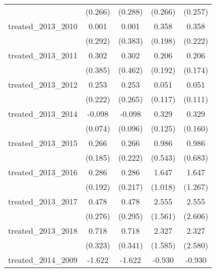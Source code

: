 {\begin{tabular}{l*{4}{c}}
            &     (0.266)         &     (0.288)         &     (0.266)         &     (0.257)         \\
[1em]
treated\_2013\_2010&       0.001         &       0.001         &       0.358         &       0.358         \\
            &     (0.292)         &     (0.383)         &     (0.198)         &     (0.222)         \\
[1em]
treated\_2013\_2011&       0.302         &       0.302         &       0.206         &       0.206         \\
            &     (0.385)         &     (0.462)         &     (0.192)         &     (0.174)         \\
[1em]
treated\_2013\_2012&       0.253         &       0.253         &       0.051         &       0.051         \\
            &     (0.222)         &     (0.265)         &     (0.117)         &     (0.111)         \\
[1em]
treated\_2013\_2014&      -0.098         &      -0.098         &       0.329\sym{**} &       0.329\sym{*}  \\
            &     (0.074)         &     (0.096)         &     (0.125)         &     (0.160)         \\
[1em]
treated\_2013\_2015&       0.266         &       0.266         &       0.986         &       0.986         \\
            &     (0.185)         &     (0.222)         &     (0.543)         &     (0.683)         \\
[1em]
treated\_2013\_2016&       0.286         &       0.286         &       1.647         &       1.647         \\
            &     (0.192)         &     (0.217)         &     (1.018)         &     (1.267)         \\
[1em]
treated\_2013\_2017&       0.478         &       0.478         &       2.555         &       2.555         \\
            &     (0.276)         &     (0.295)         &     (1.561)         &     (2.606)         \\
[1em]
treated\_2013\_2018&       0.718\sym{*}  &       0.718\sym{*}  &       2.327         &       2.327         \\
            &     (0.323)         &     (0.341)         &     (1.585)         &     (2.580)         \\
[1em]
treated\_2014\_2009&      -1.622         &      -1.622         &      -0.930\sym{***}&      -0.930\sym{***}\\

\end{tabular}}
